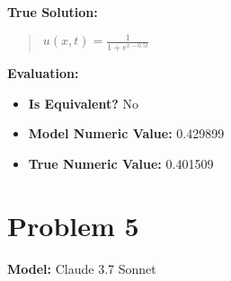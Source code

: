 \documentclass{article}
\begin{document}
\textbf{True Solution:}
\begin{quote}
$u(x, t) = \frac{1}{1 + e^{x - 0.5t}}$
\end{quote}

\textbf{Evaluation:}
\begin{itemize}
\item \textbf{Is Equivalent?} No
\item \textbf{Model Numeric Value:} 0.429899
\item \textbf{True Numeric Value:} 0.401509
\end{itemize}
\vspace{1cm}
\section*{Problem 5}
\textbf{Model:} Claude 3.7 Sonnet
\end{document}
